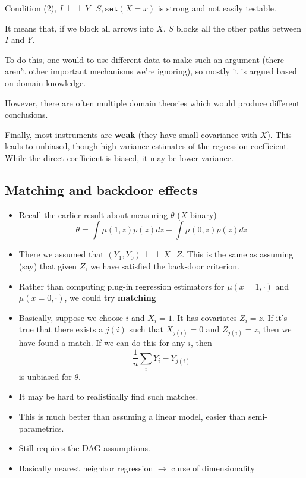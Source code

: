 \documentclass[]{article}
\begin{document}
Condition (2), \(I \perp\!\!\!\perp Y \ \vert\ S, \texttt{set}(X=x)\) is
strong and not easily testable.

It means that, if we block all arrows into \(X\), \(S\) blocks all the
other paths between \(I\) and \(Y\).

To do this, one would to use different data to make such an argument
(there aren't other important mechanisms we're ignoring), so mostly it
is argued based on domain knowledge.

However, there are often multiple domain theories which would produce
different conclusions.

Finally, most instruments are \textbf{weak} (they have small covariance
with \(X\)). This leads to unbiased, though high-variance estimates of
the regression coefficient. While the direct coefficient is biased, it
may be lower variance.

\hypertarget{matching-and-backdoor-effects}{%
\subsection{Matching and backdoor
effects}\label{matching-and-backdoor-effects}}

\begin{itemize}
\item
  Recall the earlier result about measuring \(\theta\) (\(X\) binary) \[
  \theta = \int \mu(1,z)p(z)dz - \int \mu(0,z)p(z)dz
  \]
\item
  There we assumed that \((Y_1,Y_0) \perp\!\!\!\perp X \ \vert\ Z\).
  This is the same as assuming (say) that given \(Z\), we have satisfied
  the back-door criterion.
\item
  Rather than computing plug-in regression estimators for
  \(\mu(x=1,\cdot)\) and \(\mu(x=0,\cdot)\), we could try
  \textbf{matching}
\item
  Basically, suppose we choose \(i\) and \(X_i=1\). It has covariates
  \(Z_i=z\). If it's true that there exists a \(j(i)\) such that
  \(X_{j(i)}=0\) and \(Z_{j(i)}=z\), then we have found a match. If we
  can do this for any \(i\), then \[
  \frac{1}{n}\sum_i Y_i - Y_{j(i)}
  \] is unbiased for \(\theta\).
\item
  It may be hard to realistically find such matches.
\item
  This is much better than assuming a linear model, easier than
  semi-parametrics.
\item
  Still requires the DAG assumptions.
\item
  Basically nearest neighbor regression \(\rightarrow\) curse of
  dimensionality
\end{itemize}
\end{document}
